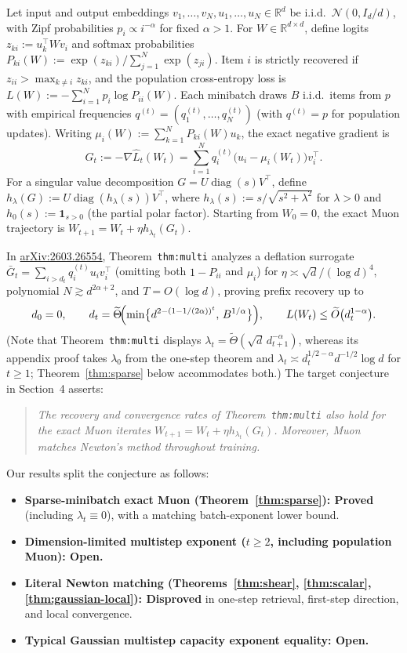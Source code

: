 \documentclass[11pt]{article}
\theoremstyle{plain}
\theoremstyle{definition}
\theoremstyle{remark}
\DeclareMathOperator{\diag}{diag}
\begin{document}
Let input and output embeddings $v_1,\dots,v_N, u_1,\dots,u_N \in \mathbb{R}^d$ be i.i.d.\ $\mathcal{N}(0, I_d/d)$, with Zipf probabilities $p_i \propto i^{-\alpha}$ for fixed $\alpha > 1$.
For $W \in \mathbb{R}^{d \times d}$, define logits $z_{ki} := u_k^\top W v_i$ and softmax probabilities $P_{ki}(W) := \exp(z_{ki}) / \sum_{j=1}^N \exp(z_{ji})$.
Item $i$ is strictly recovered if $z_{ii} > \max_{k \neq i} z_{ki}$, and the population cross-entropy loss is $L(W) := -\sum_{i=1}^N p_i \log P_{ii}(W)$.
Each minibatch draws $B$ i.i.d.\ items from $p$ with empirical frequencies $q^{(t)} = (q_1^{(t)}, \dots, q_N^{(t)})$ (with $q^{(t)} = p$ for population updates).
Writing $\mu_i(W) := \sum_{k=1}^N P_{ki}(W) u_k$, the exact negative gradient is
\[
G_t := -\nabla \widehat{L}_t(W_t) = \sum_{i=1}^N q_i^{(t)} \bigl(u_i - \mu_i(W_t)\bigr) v_i^\top.
\]
For a singular value decomposition $G = U\diag(s)V^\top$, define $h_\lambda(G) := U\diag(h_\lambda(s))V^\top$, where $h_\lambda(s) := s/\sqrt{s^2+\lambda^2}$ for $\lambda > 0$ and $h_0(s) := \mathbf{1}_{s>0}$ (the partial polar factor).
Starting from $W_0 = 0$, the exact Muon trajectory is $W_{t+1} = W_t + \eta h_{\lambda_t}(G_t)$.

In \href{https://arxiv.org/abs/2603.26554}{arXiv:2603.26554}, Theorem~\texttt{thm:multi} analyzes a deflation surrogate $\bar G_t = \sum_{i > d_t} q_i^{(t)} u_i v_i^\top$ (omitting both $1 - P_{ii}$ and $\mu_i$) for $\eta \asymp \sqrt{d}/(\log d)^4$, polynomial $N \gtrsim d^{2\alpha+2}$, and $T = O(\log d)$, proving prefix recovery up to
\[
d_0 = 0, \qquad
d_t = \widetilde\Theta\!\Bigl(\min\bigl\{d^{2-(1-1/(2\alpha))^t},\, B^{1/\alpha}\bigr\}\Bigr), \qquad
L(W_t) \le \widetilde O\bigl(d_t^{1-\alpha}\bigr).
\]
(Note that Theorem~\texttt{thm:multi} displays $\lambda_t = \widetilde\Theta(\sqrt{d}\,d_{t+1}^{-\alpha})$, whereas its appendix proof takes $\lambda_0$ from the one-step theorem and $\lambda_t \asymp d_t^{1/2-\alpha}d^{-1/2}\log d$ for $t \ge 1$; Theorem~\ref{thm:sparse} below accommodates both.)
The target conjecture in Section~4 asserts:
\begin{quote}
\emph{The recovery and convergence rates of Theorem~\textup{\texttt{thm:multi}} also hold for the exact Muon iterates $W_{t+1} = W_t + \eta h_{\lambda_t}(G_t)$. Moreover, Muon matches Newton's method throughout training.}
\end{quote}

Our results split the conjecture as follows:
\begin{itemize}[leftmargin=2em,itemsep=2pt]
\item \textbf{Sparse-minibatch exact Muon (Theorem~\ref{thm:sparse}): Proved} (including $\lambda_t \equiv 0$), with a matching batch-exponent lower bound.
\item \textbf{Dimension-limited multistep exponent ($t \ge 2$, including population Muon): Open.}
\item \textbf{Literal Newton matching (Theorems~\ref{thm:shear}, \ref{thm:scalar}, \ref{thm:gaussian-local}): Disproved} in one-step retrieval, first-step direction, and local convergence.
\item \textbf{Typical Gaussian multistep capacity exponent equality: Open.}
\end{itemize}
\end{document}
